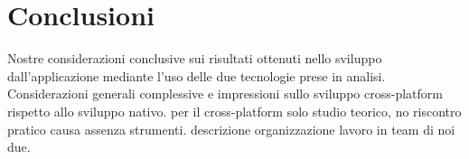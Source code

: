 \chapter{Conclusioni}
	Nostre considerazioni conclusive sui risultati ottenuti nello sviluppo 
	dall'applicazione mediante l'uso delle due tecnologie prese in analisi. 
	Considerazioni generali complessive e impressioni sullo sviluppo 
	cross-platform rispetto allo sviluppo nativo.
	per il cross-platform solo studio teorico, no riscontro pratico causa assenza
	strumenti.
	descrizione organizzazione lavoro in team di noi due.
